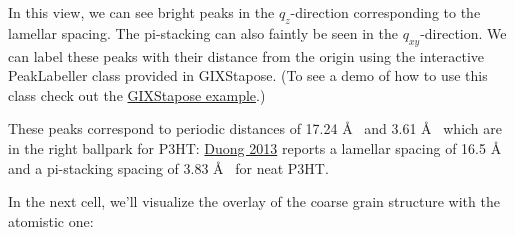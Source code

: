     \begin{center}
    \end{center}
    
    In this view, we can see bright peaks in the \(q_{z}\)-direction
corresponding to the lamellar spacing. The pi-stacking can also faintly
be seen in the \(q_{xy}\)-direction. We can label these peaks with their
distance from the origin using the interactive PeakLabeller class
provided in GIXStapose. (To see a demo of how to use this class check
out the
\href{https://github.com/cmelab/GIXStapose/blob/master/examples/Figure_Example.ipynb}{GIXStapose
example}.)

    \begin{center}
    \end{center}

These peaks correspond to periodic distances of 17.24 \AA~ and 3.61 \AA~
which are in the right ballpark for P3HT:
\href{https://www.sciencedirect.com/science/article/pii/S1566119913000840?via\%3Dihub}{Duong
2013} reports a lamellar spacing of 16.5 \AA~ and a pi-stacking spacing of
3.83 \AA~ for neat P3HT.

In the next cell, we'll visualize the overlay of the coarse grain
structure with the atomistic one:


